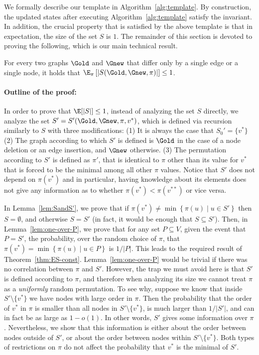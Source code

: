 We formally describe our template in Algorithm~\ref{alg:template}.
By construction, the updated states after executing Algorithm~\ref{alg:template} satisfy the \MIS invariant.
In addition, the crucial property that is satisfied by the above template is that in expectation, the size of the set $S$ is $1$. The remainder of this section is devoted to proving the following, which is our main technical result.

\begin{thm}
\label{thm:ES-const}
For every two graphs $\Gold$ and $\Gnew$ that differ only by a single edge or a single node, it holds that  
$\E_\pi \left[|S(\Gold, \Gnew, \pi)|\right] \leq 1$. 
\end{thm}


\paragraph{Outline of the proof:} In order to prove that $\E[|S|] \leq 1$, 
instead of analyzing the set $S$ directly, we analyze the set $S' = S'(\Gold,\Gnew,\pi,v^*)$,  which is defined via recursion similarly to $S$ with three modifications: (1) It is always the case that $S_0' = \{v^*\}$ (2) The graph according to which $S'$ is defined is $\Gold$ in the case of a node deletion or an edge insertion, and $\Gnew$ otherwise. (3) The permutation according to $S'$ is defined as $\pi'$, that is identical to $\pi$ other than its value for $v^*$ that is forced to be the minimal among all other $\pi$ values. Notice that $S'$ does not depend on $\pi(v^*)$ and in particular, having knowledge about its elements does not give any information as to whether $\pi(v^*) < \pi(v^{**})$ or vice versa. 






In Lemma~\ref{lem:SandS'}, we prove that if $\pi(v^*) \neq \min\left\{ \pi(u)\mid u\in S'\right\}$ then $S=\emptyset$, and otherwise $S=S'$ (in fact, it would be enough that $S\subseteq S'$). Then, in Lemma~\ref{lem:one-over-P}, we prove that for any set $P \subseteq V$, given the event that $P=S'$, the probability, over the random choice of $\pi$, that $\pi(v^*) =\min\left\{ \pi(u)\mid u\in P\right\}$ is $1/|P|$. This leads to the required result of Theorem~\ref{thm:ES-const}.
Lemma~\ref{lem:one-over-P} would be trivial if there was no correlation between $\pi$ and $S'$. However, the trap we must avoid here is that $S'$ is defined according to $\pi$, and therefore when analyzing its size we cannot treat $\pi$ as a \emph{uniformly} random permutation. To see why, suppose we know that inside $S'\setminus\{v^*\}$ we have nodes with large order in $\pi$. Then the probability that the order of $v^*$ in $\pi$ is smaller than all nodes in $S'\setminus\{v^*\}$, is much larger than $1/|S'|$, and can in fact be as large as $1-o(1)$. In other words, $S'$ gives some information over $\pi$. Nevertheless, we show that this information is either about the order between nodes outside of $S'$, or about the order between nodes within $S'\setminus\{v^*\}$. Both types of restrictions on $\pi$ do not affect the probability that $v^*$ is the minimal of $S'$.



